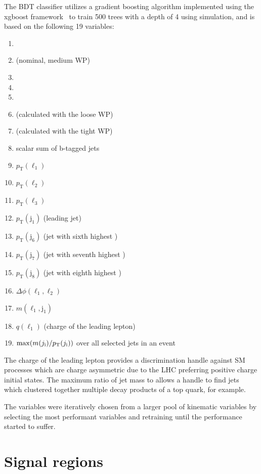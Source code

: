 The BDT classifier utilizes a gradient boosting algorithm 
implemented using the xgboost framework~\cite{MISC:xgboost}
to train 500 trees
with a depth of 4 using simulation, and is based on the following 19
variables:
\begin{enumerate}
    \item \Njets
    \item \Nbjets (nominal, medium WP)
    \item \Nleps
    \item \ptmiss
    \item \HT
    \item \Nbjets (calculated with the loose WP)
    \item \Nbjets (calculated with the tight WP)
    \item scalar \pt sum of b-tagged jets
    \item $p_\mathrm{T}(\ell_1)$
    \item $p_\mathrm{T}(\ell_2)$
    \item $p_\mathrm{T}(\ell_3)$
    \item $p_\mathrm{T}(\mathrm{j}_1)$  (leading jet)
    \item $p_\mathrm{T}(\mathrm{j}_6)$ (jet with sixth highest \pt)
    \item $p_\mathrm{T}(\mathrm{j}_7)$ (jet with seventh highest \pt)
    \item $p_\mathrm{T}(\mathrm{j}_8)$ (jet with eighth highest \pt)
    \item $\Delta\phi(\ell_1,\ell_2)$
    \item $m(\ell_1,\mathrm{j}_1)$
    \item $q(\ell_1)$ (charge of the leading lepton)
    \item $\mathrm{max}(m(j_\mathrm{i})/p_{\mathrm{T}}(j_\mathrm{i}))$ over all selected jets in an event
\end{enumerate}

The charge of the leading lepton provides a discrimination handle against SM processes which are
charge asymmetric due to the LHC preferring positive charge initial states.
The maximum ratio of jet mass to \pt allows a handle to find jets which clustered together 
multiple decay products of a top quark, for example.

The variables were iteratively chosen from a larger pool of kinematic variables by selecting
the most performant variables and retraining until the performance started to suffer.


\section{Signal regions}

